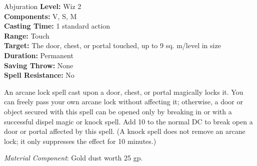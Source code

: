 {Abjuration}
{
	\textbf{Level:}
	Wiz 2\\
	\textbf{Components:}
	V, S, M\\
	\textbf{Casting Time:}
	1 standard action\\
	\textbf{Range:}
	Touch\\
	\textbf{Target:}
	The door, chest, or portal touched, up to 9 sq. m/level in size\\
	\textbf{Duration:}
	Permanent\\
	\textbf{Saving Throw:}
	None\\
	\textbf{Spell Resistance:}
	No\\
}
{
	An arcane lock spell cast upon a door, chest, or portal magically locks it. You can freely pass your own arcane lock without affecting it; otherwise, a door or object secured with this spell can be opened only by breaking in or with a successful dispel magic or knock spell. Add 10 to the normal DC to break open a door or portal affected by this spell. (A knock spell does not remove an arcane lock; it only suppresses the effect for 10 minutes.)

	\textit{Material Component}:
	Gold dust worth 25 gp.

}
